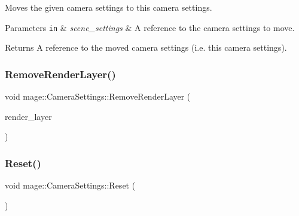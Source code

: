 Moves the given camera settings to this camera settings.


\begin{DoxyParams}[1]{Parameters}
\mbox{\tt in}  & {\em scene\+\_\+settings} & A reference to the camera settings to move. \\
\hline
\end{DoxyParams}
\begin{DoxyReturn}{Returns}
A reference to the moved camera settings (i.\+e. this camera settings). 
\end{DoxyReturn}
\hypertarget{structmage_1_1_camera_settings_a358ab9da30af67ca8b1ea2a5eb5a2710}{}\label{structmage_1_1_camera_settings_a358ab9da30af67ca8b1ea2a5eb5a2710} 
\subsubsection{\texorpdfstring{Remove\+Render\+Layer()}{RemoveRenderLayer()}}
{\footnotesize\ttfamily void mage\+::\+Camera\+Settings\+::\+Remove\+Render\+Layer (\begin{DoxyParamCaption}\item[{\hyperlink{namespacemage_a8b4a82582105b0299e2c2be5af7255d6}{Render\+Layer}}]{render\+\_\+layer }\end{DoxyParamCaption})\hspace{0.3cm}{\ttfamily [noexcept]}}

\hypertarget{structmage_1_1_camera_settings_a4894cae6954c111339be554e8dd9562c}{}\label{structmage_1_1_camera_settings_a4894cae6954c111339be554e8dd9562c} 
\subsubsection{\texorpdfstring{Reset()}{Reset()}}
{\footnotesize\ttfamily void mage\+::\+Camera\+Settings\+::\+Reset (\begin{DoxyParamCaption}{ }\end{DoxyParamCaption})\hspace{0.3cm}{\ttfamily [noexcept]}}

\hypertarget{structmage_1_1_camera_settings_a1f8b3952282d153db4fb6416e9d933b7}{}\label{structmage_1_1_camera_settings_a1f8b3952282d153db4fb6416e9d933b7} 
